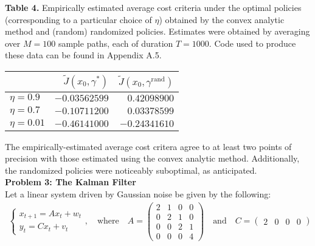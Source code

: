 \documentclass[10pt]{article}
\newcommand{\1}[1]{\mathbbm{1}_{#1}}
\begin{document}
    \begin{center}
        \begin{minipage}{\dimexpr\paperwidth-5cm}
            {\bf Table 4.} Empirically estimated average cost criteria under the optimal policies (corresponding to a particular choice of $\eta$) obtained by the convex analytic method and (random) randomized policies.
            Estimates were obtained by averaging over $M=100$ sample paths, each of duration $T=1000$. Code used to produce these data can be found in Appendix A.5.
        \end{minipage}
    \end{center}
    \begin{center}
        \begin{tabular}{@{}l|rr@{}}\toprule
                & $\tilde{J}(x_0,\gamma^\ast)$ & $\tilde{J}(x_0, \gamma^{\text{rand}})$ \\\midrule
            $\eta=0.9$ & $-0.03562599$ & $0.42098900$ \\ 
            $\eta=0.7$ & $-0.10711200$ & $0.03378599$ \\
            $\eta=0.01$ & $-0.46141000$ & $-0.24341610$ \\
            \bottomrule
        \end{tabular}
    \end{center}
    The empirically-estimated average cost critera agree to at least two points of precision with those estimated using the convex analytic method. Additionally, the randomized policies were noticeably suboptimal, as anticipated.\\[5pt]
    {\bf Problem 3: The Kalman Filter}\\[5pt]
    Let a linear system driven by Gaussian noise be given by the following:
    \begin{align*}
        \begin{cases}
            x_{t+1}=Ax_t+w_t\\
            y_t=Cx_t+v_t
        \end{cases},\quad\text{where}\quad
        A=\begin{pmatrix}
          2 & 1 & 0 & 0\\
          0 & 2 & 1 & 0\\
          0 & 0 & 2 & 1\\
          0 & 0 & 0 & 4  
        \end{pmatrix}\quad\text{and}\quad C=\begin{pmatrix}
            2 & 0 & 0 & 0
        \end{pmatrix}\tag{$\ast$}
    \end{align*}
\end{document}
